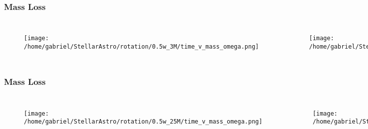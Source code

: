 \documentclass{beamer}
\begin{document}


\begin{frame}
\frametitle{Mass Loss}
	\begin{columns}[c]
\begin{figure}
    \begin{center}
      \texttt{[image: /home/gabriel/StellarAstro/rotation/0.5w\_3M/time\_v\_mass\_omega.png]}
    \end{center}
  \end{figure}

	\begin{figure}
    \begin{center}
      \texttt{[image: /home/gabriel/StellarAstro/rotation/0.9w\_3M/time\_v\_mass\_omega.png]}
    \end{center}
  \end{figure}

	\end{columns}
\end{frame}




\begin{frame}
\frametitle{Mass Loss}
        \begin{columns}[c]
\begin{figure}
    \begin{center}
      \texttt{[image: /home/gabriel/StellarAstro/rotation/0.5w\_25M/time\_v\_mass\_omega.png]}
    \end{center}
  \end{figure}

        \begin{figure}
    \begin{center}
      \texttt{[image: /home/gabriel/StellarAstro/rotation/0.9w\_25M/time\_v\_mass\_omega.png]}
    \end{center}
  \end{figure}

        \end{columns}
\end{frame}

\end{document}
